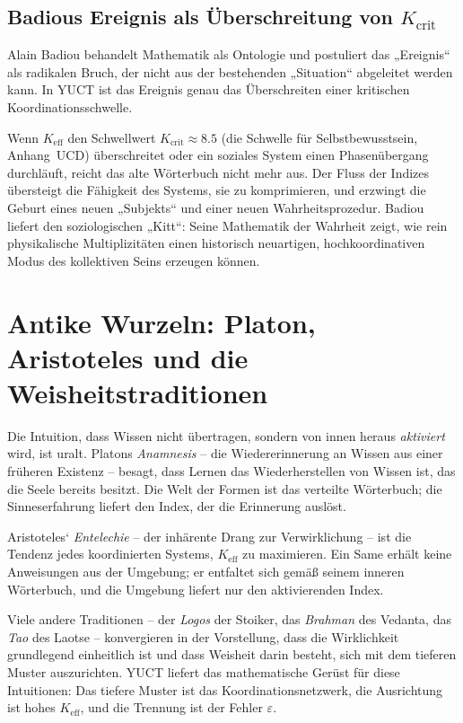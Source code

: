 \documentclass[12pt,a4paper]{article}
\newcommand{\Keff}{K_{\mathrm{eff}}}
\begin{document}
	\subsection{Badious Ereignis als Überschreitung von \(K_{\mathrm{crit}}\)}
	
	Alain Badiou behandelt Mathematik als Ontologie und postuliert das „Ereignis“ als radikalen Bruch, der nicht aus der bestehenden „Situation“ abgeleitet werden kann. In YUCT ist das Ereignis genau das Überschreiten einer kritischen Koordinationsschwelle.
	
	Wenn \(\Keff\) den Schwellwert \(K_{\mathrm{crit}} \approx 8.5\) (die Schwelle für Selbstbewusstsein, Anhang~UCD) überschreitet oder ein soziales System einen Phasenübergang durchläuft, reicht das alte Wörterbuch nicht mehr aus. Der Fluss der Indizes übersteigt die Fähigkeit des Systems, sie zu komprimieren, und erzwingt die Geburt eines neuen „Subjekts“ und einer neuen Wahrheitsprozedur. Badiou liefert den soziologischen „Kitt“: Seine Mathematik der Wahrheit zeigt, wie rein physikalische Multiplizitäten einen historisch neuartigen, hochkoordinativen Modus des kollektiven Seins erzeugen können.
	
	\section{Antike Wurzeln: Platon, Aristoteles und die Weisheitstraditionen}
	
	Die Intuition, dass Wissen nicht übertragen, sondern von innen heraus \emph{aktiviert} wird, ist uralt. Platons \emph{Anamnesis} – die Wiedererinnerung an Wissen aus einer früheren Existenz – besagt, dass Lernen das Wiederherstellen von Wissen ist, das die Seele bereits besitzt. Die Welt der Formen ist das verteilte Wörterbuch; die Sinneserfahrung liefert den Index, der die Erinnerung auslöst.
	
	Aristoteles‘ \emph{Entelechie} – der inhärente Drang zur Verwirklichung – ist die Tendenz jedes koordinierten Systems, \(K_{\mathrm{eff}}\) zu maximieren. Ein Same erhält keine Anweisungen aus der Umgebung; er entfaltet sich gemäß seinem inneren Wörterbuch, und die Umgebung liefert nur den aktivierenden Index.
	
	Viele andere Traditionen – der \emph{Logos} der Stoiker, das \emph{Brahman} des Vedanta, das \emph{Tao} des Laotse – konvergieren in der Vorstellung, dass die Wirklichkeit grundlegend einheitlich ist und dass Weisheit darin besteht, sich mit dem tieferen Muster auszurichten. YUCT liefert das mathematische Gerüst für diese Intuitionen: Das tiefere Muster ist das Koordinationsnetzwerk, die Ausrichtung ist hohes \(K_{\mathrm{eff}}\), und die Trennung ist der Fehler \(\varepsilon\).
	
\end{document}
